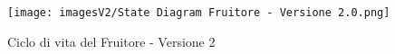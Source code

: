 \begin{figure}[t!]
\centering
\texttt{[image: imagesV2/State Diagram Fruitore - Versione 2.0.png]}
\caption{\label{fig:State diagram 2.2}Ciclo di vita del Fruitore - Versione 2}
\end{figure}\bigskip
